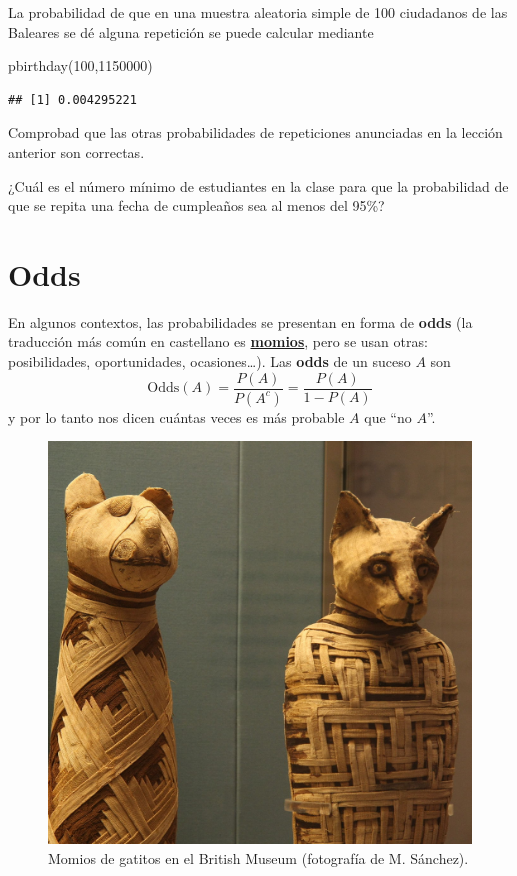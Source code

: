 \documentclass[
]{book}
\newenvironment{Shaded}{\begin{snugshade}}{\end{snugshade}}
\newcommand{\DecValTok}[1]{\textcolor[rgb]{0.00,0.00,0.81}{#1}}
\newcommand{\FunctionTok}[1]{\textcolor[rgb]{0.00,0.00,0.00}{#1}}
\newcommand{\NormalTok}[1]{#1}
\theoremstyle{definition}
\theoremstyle{definition}
\theoremstyle{definition}
\theoremstyle{definition}
\theoremstyle{remark}
\begin{document}
La probabilidad de que en una muestra aleatoria simple de 100 ciudadanos de las Baleares se dé alguna repetición se puede calcular mediante

\begin{Shaded}
\begin{Highlighting}[]
\FunctionTok{pbirthday}\NormalTok{(}\DecValTok{100}\NormalTok{,}\DecValTok{1150000}\NormalTok{)}
\end{Highlighting}
\end{Shaded}

\begin{verbatim}
## [1] 0.004295221
\end{verbatim}

\begin{rmdexercici}
Comprobad que las otras probabilidades de repeticiones anunciadas en la lección anterior son correctas.
\end{rmdexercici}

\begin{rmdexercici}
¿Cuál es el número mínimo de estudiantes en la clase para que la probabilidad de que se repita una fecha de cumpleaños sea al menos del 95\%?
\end{rmdexercici}

\hypertarget{sec:odds}{%
\section{Odds}\label{sec:odds}}

En algunos contextos, las probabilidades se presentan en forma de \textbf{odds} (la traducción más común en castellano es \href{https://es.wikipedia.org/wiki/Apuesta_deportiva\#Momios_o_Cuotas_Deportivas}{\textbf{momios}}, pero se usan otras: posibilidades, oportunidades, ocasiones\ldots). Las \textbf{odds} de un suceso \(A\) son
\[
\text{Odds}(A)=\frac{P(A)}{P(A^c)}=\frac{P(A)}{1-P(A)}
\]
y por lo tanto nos dicen cuántas veces es más probable \(A\) que ``no \(A\)''.

\begin{figure}

{\centering \includegraphics[width=0.5\linewidth]{INREMDN_files/figure-html/catmummies} 

}

\caption{Momios de gatitos en el British Museum (fotografía de M. Sánchez).}\label{fig:catmummies}
\end{figure}
\end{document}
